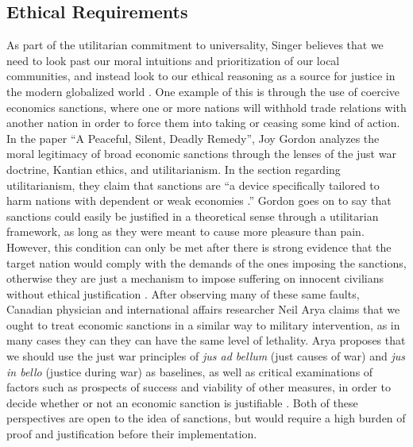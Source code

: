 \documentclass[12pt]{article}
\begin{document}
\subsection*{Ethical Requirements}
As part of the utilitarian commitment to universality, Singer believes that we need to look past our moral intuitions and prioritization of our local communities, and instead look to our ethical reasoning as a source for justice in the modern globalized world \autocite[14]{singer2016}.
One example of this is through the use of coercive economics sanctions, where one or more nations will withhold trade relations with another nation in order to force them into taking or ceasing some kind of action.
In the paper ``A Peaceful, Silent, Deadly Remedy'', Joy Gordon analyzes the moral legitimacy of broad economic sanctions through the lenses of the just war doctrine, Kantian ethics, and utilitarianism.
In the section regarding utilitarianism, they claim that sanctions are ``a device specifically tailored to harm nations with dependent or weak economies \autocite[135]{gordon1999}.''
Gordon goes on to say that sanctions could easily be justified in a theoretical sense through a utilitarian framework, as long as they were meant to cause more pleasure than pain.
However, this condition can only be met after there is strong evidence that the target nation would comply with the demands of the ones imposing the sanctions, otherwise they are just a mechanism to impose suffering on innocent civilians without ethical justification \autocite[137]{gordon1999}.
After observing many of these same faults, Canadian physician and international affairs researcher Neil Arya claims that we ought to treat economic sanctions in a similar way to military intervention, as in many cases they can they can have the same level of lethality.
Arya proposes that we should use the just war principles of \textit{jus ad bellum} (just causes of war) and \textit{jus in bello} (justice during war) as baselines, as well as critical examinations of factors such as prospects of success and viability of other measures, in order to decide whether or not an economic sanction is justifiable \autocite[35]{arya2008}.
Both of these perspectives are open to the idea of sanctions, but would require a high burden of proof and justification before their implementation.
\end{document}
